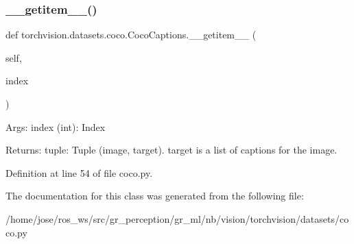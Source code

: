 \subsubsection{\texorpdfstring{\+\_\+\+\_\+getitem\+\_\+\+\_\+()}{\_\_getitem\_\_()}}
{\footnotesize\ttfamily def torchvision.\+datasets.\+coco.\+Coco\+Captions.\+\_\+\+\_\+getitem\+\_\+\+\_\+ (\begin{DoxyParamCaption}\item[{}]{self,  }\item[{}]{index }\end{DoxyParamCaption})}

\begin{DoxyVerb}Args:
    index (int): Index

Returns:
    tuple: Tuple (image, target). target is a list of captions for the image.
\end{DoxyVerb}
 

Definition at line 54 of file coco.\+py.



The documentation for this class was generated from the following file\+:\begin{DoxyCompactItemize}
\item 
/home/jose/ros\+\_\+ws/src/gr\+\_\+perception/gr\+\_\+ml/nb/vision/torchvision/datasets/coco.\+py\end{DoxyCompactItemize}
